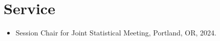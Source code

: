 \documentclass[letterpaper,12pt]{article}
\newcommand{\resumeItem}[2]{
  \item\small{
    \textbf{#1}{ #2 \vspace{-2pt}}
  }
}
\newcommand{\resumeSubItem}[2]{\resumeItem{#1}{#2}\vspace{-4pt}}
\newcommand{\resumeSubHeadingListStart}{\begin{itemize}[leftmargin=*]}
\newcommand{\resumeSubHeadingListEnd}{\end{itemize}}
\newcommand{\shorterSection}[1]{\vspace{-10pt}\section{#1}}
\begin{document}
     \shorterSection{Service}
     \resumeSubHeadingListStart
     \item{Session Chair for Joint Statistical Meeting, Portland, OR, 2024.}
     \resumeSubHeadingListEnd

%
\end{document}
